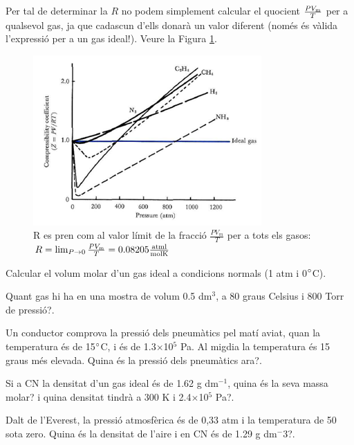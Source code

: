 Per tal de determinar la $R$ no podem simplement calcular el quocient $\frac{P V_{\rm m}}{T}$ per a qualsevol gas, ja que cadascun d'ells donarà un valor diferent (només és vàlida l'expressió per a un gas ideal!). Veure la Figura \ref{fig:R2}.
\begin{figure}[h]
\centering
\includegraphics[scale=1.0]{figures/R2.png}
\caption[Determinació de la constant dels gasos $R$]{R es pren com al valor límit de la fracció $\frac{P V_m}{T}$ per a tots els gasos: 
$R=\lim_{P \to 0} \frac{P V_{\rm m}}{T}= 0.08205 \frac{{\rm atm l}}{{\rm mol K}}$
}
\label{fig:R2}
\end{figure}

\begin{exr}
Calcular el volum molar d'un gas ideal a condicions normals (1 atm i 0$\degree$C).
\end{exr}

\begin{exr}
Quant gas hi ha en una mostra de volum 0.5 dm$^3$, a 80 graus Celsius i 800 Torr de pressió?.
\end{exr}

\begin{exr}
Un conductor comprova la pressió dels pneumàtics pel matí aviat, quan la temperatura és de 15$\degree$C, i és de 1.3$\times$10$^5$ Pa. Al migdia la temperatura és 15 graus més elevada. Quina és la pressió dels pneumàtics ara?.
\end{exr}

\begin{exr}
Si a CN la densitat d'un gas ideal és de 1.62 g dm$^{-1}$, quina és la seva massa molar? i quina densitat tindrà a 300 K i 2.4$\times$10$^5$ Pa?.
\end{exr}

\begin{exr}
Dalt de l'Everest, la pressió atmosfèrica és de 0,33 atm i la temperatura de 50 sota zero. Quina és la densitat de l'aire i en CN és de 1.29 g dm$^-3$?.
\end{exr}

